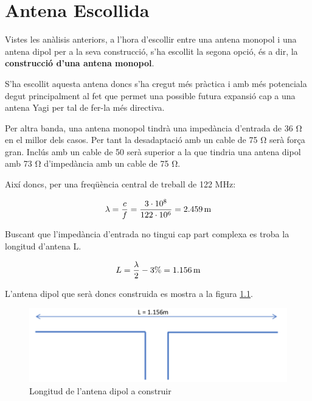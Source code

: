 \chapter{Antena Escollida}

Vistes les anàlisis anteriors, a l'hora d'escollir entre una antena monopol i una antena dipol per a la seva construcció, s'ha escollit la segona opció, és a dir, la \textbf{construcció d'una antena monopol}.

S'ha escollit aquesta antena doncs s’ha cregut més pràctica i amb més potenciala degut principalment al fet que permet una possible futura expansió cap a una antena Yagi per tal de fer-la més directiva. 

Per altra banda, una antena monopol tindrà una impedància d’entrada de 36 $\si{\ohm}$ en el millor dels casos. Per tant la desadaptació amb un cable de 75 $\si{\ohm}$ serà força gran. Inclús amb un cable de 50 serà superior a la que tindria una antena dipol amb 73 $\si{\ohm}$ d’impedància amb un cable de 75 $\si{\ohm}$.

Així doncs, per una freqüència central de treball de 122 MHz:

\begin{equation}
\notag
  \lambda=\frac{c}{f}=\frac{3\cdot10^8}{122\cdot10^6}= 2.459\,\mathrm{m}
\end{equation}

Buscant que l'impedància d'entrada no tingui cap part complexa es troba la longitud d'antena L. 

\begin{equation}
\notag
  L=\frac{\lambda}{2}-3\%= 1.156\,\mathrm{m}
\end{equation}

L'antena dipol que serà doncs construida es mostra a la figura \ref{LAntena}.
\begin{figure}[H]
\includegraphics[width=1\textwidth]{./images/LAntena}
\caption{Longitud de l'antena dipol a construir}
\label{LAntena}
\end{figure}




